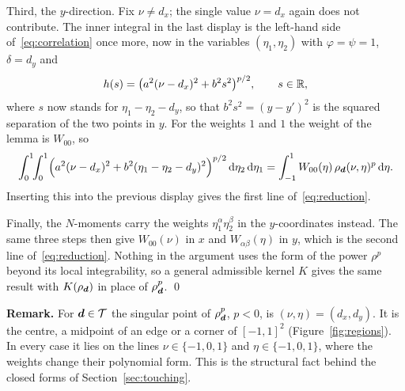 Third, the $y$-direction. Fix $\nu\ne d_x$; the single value $\nu=d_x$ again does not contribute. The inner integral
in the last display is the left-hand side of~\eqref{eq:correlation} once more, now in the variables $(\eta_1,\eta_2)$
with $\varphi=\psi=1$, $\delta=d_y$ and
\begin{equation}
    h(s)=\bigl(a^2(\nu-d_x)^2+b^2s^2\bigr)^{p/2}, \qquad s\in\mathbb{R} ,
\end{equation}
where $s$ now stands for $\eta_1-\eta_2-d_y$, so that $b^2s^2=(y-y')^2$ is the squared separation of the two points
in $y$.
For the weights $1$ and $1$ the weight of the lemma is $W_{00}$, so
\begin{equation}
    \int_0^1\!\!\int_0^1\Bigl(a^2(\nu-d_x)^2+b^2(\eta_1-\eta_2-d_y)^2\Bigr)^{p/2}\,\mathrm{d}\eta_2\,\mathrm{d}\eta_1
    = \int_{-1}^{1} W_{00}(\eta)\,\rho_{\vb*{d}}(\nu,\eta)^p\,\mathrm{d}\eta .
\end{equation}
Inserting this into the previous display gives the first line of~\eqref{eq:reduction}.

Finally, the $N$-moments carry the weights $\eta_1^\alpha\eta_2^\beta$ in the $y$-coordinates instead. The same three
steps then give $W_{00}(\nu)$ in $x$ and $W_{\alpha\beta}(\eta)$ in $y$, which is the second line
of~\eqref{eq:reduction}. Nothing in the argument uses the form of the power $\rho^p$ beyond its local integrability, so
a general admissible kernel $K$ gives the same result with $K(\rho_{\vb*{d}})$ in place of $\rho_{\vb*{d}}^p$. \qed

\vspace{\baselineskip}
\noindent\textbf{Remark.} For $\vb*{d}\in\mathcal{T}$ the singular point of $\rho_{\vb*{d}}^p$, $p<0$, is
$(\nu,\eta)=(d_x,d_y)$. It is the centre, a midpoint of an edge or a corner of $[-1,1]^2$ (Figure~\ref{fig:regions}). In every case it lies on
the lines $\nu\in\{-1,0,1\}$ and $\eta\in\{-1,0,1\}$, where the weights change their polynomial form. This is the
structural fact behind the closed forms of Section~\ref{sec:touching}.
